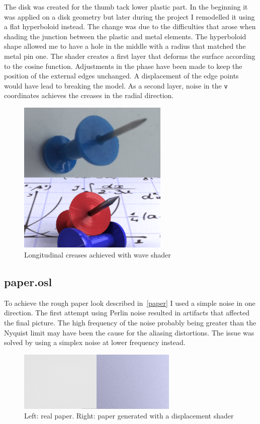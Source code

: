 \documentclass[tog]{acmsiggraph}
\begin{document}
The disk was created for the thumb tack lower plastic part. In the beginning it was applied on a disk geometry but later during the project I remodelled it using a flat hyperboloid instead. The change was due to the difficulties that arose when shading the junction between the plastic and metal elements. The hyperboloid shape allowed me to have a hole in the middle with a radius that matched the metal pin one. The shader creates a first layer that deforms the surface according to the cosine function. Adjustments in the phase have been made to keep the position of the external edges unchanged. A displacement of the edge points would have lead to breaking the model. As a second layer, noise in the \texttt{v} coordinates achieves the creases in the radial direction.

\begin{figure}[ht]
  \centering
  \includegraphics[height=2.9in]{images/disk.png}
  \caption{Longitudinal creases achieved with wave shader}
  \label{fig:disk}
\end{figure}

\subsection{paper.osl}

To achieve the rough paper look described in~\ref{paper} I used a simple noise in one direction. The first attempt using Perlin noise resulted in artifacts that affected the final picture. The high frequency of the noise probably being greater than the Nyquist limit may have been the cause for the aliasing distortions. The issue was solved by using a simplex noise at lower frequency instead.

\begin{figure}[ht]
  \centering
  \includegraphics[width=3.0in]{images/paper.png}
  \caption{Left: real paper. Right: paper generated with a displacement shader}
  \label{fig:paper}
\end{figure}
\end{document}
